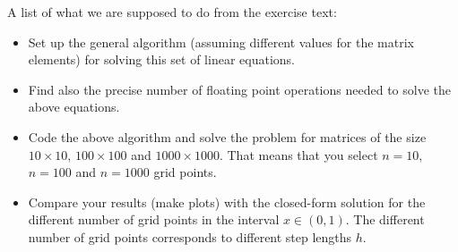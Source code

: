 
A list of what we are supposed to do from the exercise text:

\begin{itemize}

\item Set up the general algorithm (assuming different values for the matrix elements) for solving this set of linear equations.

\item Find also the precise number of floating point 
operations needed to solve the above equations. 

\item Code the above algorithm and solve the problem for matrices of the size
$10\times 10$, $100\times 100$ and $1000\times 1000$.  That means that you select $n=10$, $n=100$ and
$n=1000$ grid points. 

\item Compare your results (make plots) with the closed-form solution for the different number of grid points  in the 
interval $x\in(0,1)$.  The different number of grid points corresponds to different step lengths $h$.

\end{itemize}
